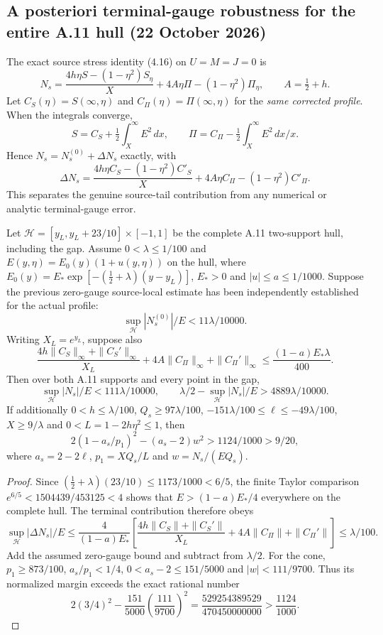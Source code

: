 \subsection*{A posteriori terminal-gauge robustness for the entire A.11 hull (22 October 2026)}
\label{subsec:a11-gauge-robust-20261022}
The exact source stress identity (4.16) on $U=M=J=0$ is
\[
N_s=\frac{4h\eta S-(1-\eta^2)S_\eta}{X}
+4A\eta\Pi-(1-\eta^2)\Pi_\eta,\qquad A=\tfrac12+h.
\]
Let $C_S(\eta)=S(\infty,\eta)$ and $C_\Pi(\eta)=\Pi(\infty,\eta)$
for the \emph{same corrected profile}. When the integrals converge,
\[
S=C_S+\tfrac12\int_X^\infty E^2\,dx,\qquad
\Pi=C_\Pi-\tfrac12\int_X^\infty E^2\,dx/x.
\]
Hence $N_s=N_s^{(0)}+\Delta N_s$ exactly, with
\[
\Delta N_s=\frac{4h\eta C_S-(1-\eta^2)C'_S}{X}
+4A\eta C_\Pi-(1-\eta^2)C'_\Pi.
\]
This separates the genuine source-tail contribution from any
numerical or analytic terminal-gauge error.

\begin{theorem}
\label{thm:a11-gauge-robust-20261022}
Let $\mathcal H=[y_L,y_L+23/10]\times[-1,1]$ be the complete A.11
two-support hull, including the gap. Assume $0<\lambda\le1/100$ and
$E(y,\eta)=E_0(y)(1+u(y,\eta))$ on the hull, where
$E_0(y)=E_*\exp[-(\frac12+\lambda)(y-y_L)]$,
$E_*>0$ and $|u|\le a\le1/1000$.
Suppose the previous zero-gauge source-local estimate has been
independently established for the actual profile:
\[
\sup_{\mathcal H}|N_s^{(0)}|/E<11\lambda/10000.
\]
Writing $X_L=e^{y_L}$, suppose also
\begin{equation}\label{eq:a11-robust-residual-budget}
\frac{4h\|C_S\|_\infty+\|C_S'\|_\infty}{X_L}
+4A\|C_\Pi\|_\infty+\|C_\Pi'\|_\infty
\le\frac{(1-a)E_*\lambda}{400}.
\end{equation}
Then over both A.11 supports and every point in the gap,
\[
\sup_{\mathcal H}|N_s|/E<111\lambda/10000,\qquad
\lambda/2-\sup_{\mathcal H}|N_s|/E>4889\lambda/10000.
\]
If additionally $0<h\le\lambda/100$,
$Q_s\ge97\lambda/100$,
$-151\lambda/100\le\ell\le-49\lambda/100$,
$X\ge9/\lambda$ and $0<L=1-2h\eta^2\le1$, then
\[
2(1-a_s/p_1)^2-(a_s-2)w^2>1124/1000>9/20,
\]
where $a_s=2-2\ell$, $p_1=XQ_s/L$ and $w=N_s/(EQ_s)$.
\end{theorem}
\begin{proof}
Since $(\frac12+\lambda)(23/10)\le1173/1000<6/5$,
the finite Taylor comparison
$e^{6/5}<1504439/453125<4$ shows that
$E>(1-a)E_*/4$ everywhere on the complete hull.
The terminal contribution therefore obeys
\[
\sup_{\mathcal H}|\Delta N_s|/E\le
\frac4{(1-a)E_*}
\left[\frac{4h\|C_S\|+\|C_S'\|}{X_L}
+4A\|C_\Pi\|+\|C_\Pi'\|\right]\le\lambda/100.
\]
Add the assumed zero-gauge bound and subtract from $\lambda/2$.
For the cone, $p_1\ge873/100$, $a_s/p_1<1/4$,
$0<a_s-2\le151/5000$ and $|w|<111/9700$.
Thus its normalized margin exceeds the exact rational number
\[
2(3/4)^2-\frac{151}{5000}\left(\frac{111}{9700}\right)^2
=\frac{529254389529}{470450000000}>\frac{1124}{1000}.
\]
\end{proof}
